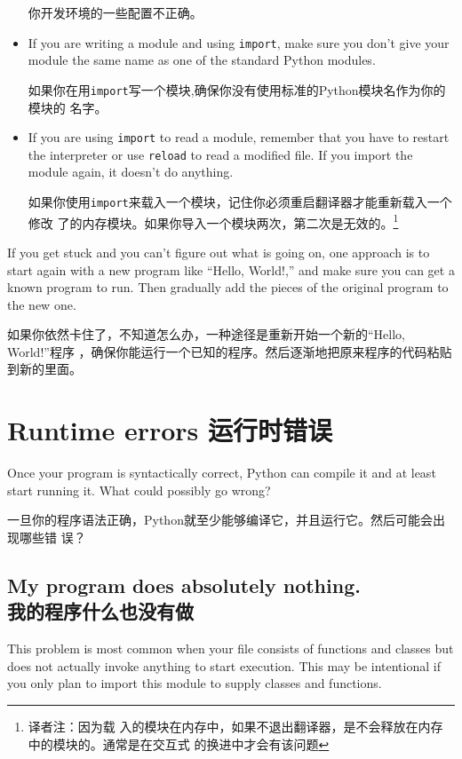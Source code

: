 \documentclass[10pt]{book}
\begin{document}
\begin{CJK}{UTF8}{gbsn}
\begin{itemize}
你开发环境的一些配置不正确。

\item If you are writing a module and using {\tt import},
make sure you don't give your module the same name as one
of the standard Python modules.

如果你在用{\tt import}写一个模块,确保你没有使用标准的Python模块名作为你的模块的
名字。

\item If you are using {\tt import} to read a module, remember
that you have to restart the interpreter or use {\tt reload}
to read a modified file.  If you import the module again, it
doesn't do anything.

如果你使用{\tt import}来载入一个模块，记住你必须重启翻译器才能重新载入一个修改
了的内存模块。如果你导入一个模块两次，第二次是无效的。\footnote{译者注：因为载
入的模块在内存中，如果不退出翻译器，是不会释放在内存中的模块的。通常是在交互式
的换进中才会有该问题}

\end{itemize}

If you get stuck and you can't figure out what is going on, one
approach is to start again with a new program like ``Hello, World!,''
and make sure you can get a known program to run.  Then gradually add
the pieces of the original program to the new one.

如果你依然卡住了，不知道怎么办，一种途径是重新开始一个新的``Hello, World!''程序
，确保你能运行一个已知的程序。然后逐渐地把原来程序的代码粘贴到新的里面。

\section{Runtime errors 运行时错误}

Once your program is syntactically correct,
Python can compile it and at least start running it.  What could
possibly go wrong?

一旦你的程序语法正确，Python就至少能够编译它，并且运行它。然后可能会出现哪些错
误？

\subsection{My program does absolutely nothing.\\我的程序什么也没有做}

This problem is most common when your file consists of functions and
classes but does not actually invoke anything to start execution.
This may be intentional if you only plan to import this module to
supply classes and functions.


\end{CJK}
\end{document}
